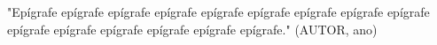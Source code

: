 \begin{epigrafe}
"Epígrafe epígrafe epígrafe epígrafe epígrafe epígrafe epígrafe epígrafe epígrafe epígrafe epígrafe epígrafe epígrafe epígrafe epígrafe." (AUTOR, ano)
\end{epigrafe}